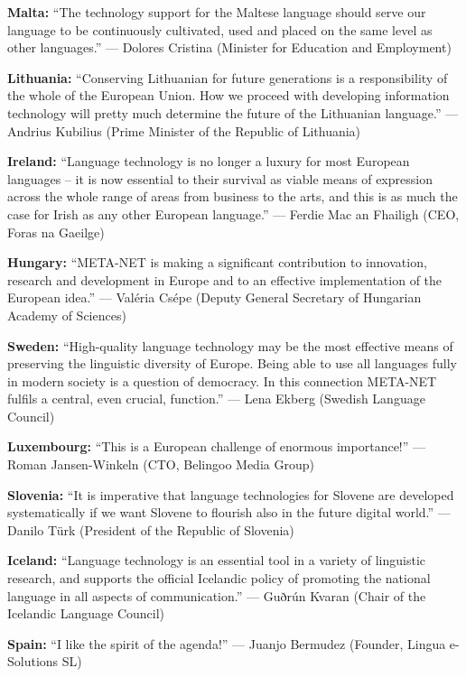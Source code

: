 \documentclass[10pt, plain]{../../metanetpaper}
\begin{document}
\medskip \textbf{Malta:} ``The technology support for the Maltese language should serve our language to be continuously cultivated, used and placed on the same level as other languages.'' --- Dolores Cristina (Minister for Education and Employment)

\medskip \textbf{Lithuania:} ``Conserving Lithuanian for future generations is a responsibility of the whole of the European Union. How we proceed with developing information technology will pretty much determine the future of the Lithuanian language.'' --- Andrius Kubilius (Prime Minister of the Republic of Lithuania)

\medskip \textbf{Ireland:} ``Language technology is no longer a luxury for most European languages -- it is now essential to their survival as viable means of expression across the whole range of areas from business to the arts, and this is as much the case for Irish as any other European language.'' --- Ferdie Mac an Fhailigh (CEO, Foras na Gaeilge)

\medskip \textbf{Hungary:} ``META-NET is making a significant contribution to innovation, research and development in Europe and to an effective implementation of the European idea.'' --- Valéria Csépe (Deputy General Secretary of Hungarian Academy of Sciences)

\medskip \textbf{Sweden:} ``High-quality language technology may be the most effective means of preserving the linguistic diversity of Europe. Being able to use all languages fully in modern society is a question of democracy. In this connection META-NET fulfils a central, even crucial, function.'' --- Lena Ekberg (Swedish Language Council)

\medskip \textbf{Luxembourg:} ``This is a European challenge of enormous importance!'' --- Roman Jansen-Winkeln (CTO, Belingoo Media Group)

\medskip \textbf{Slovenia:} ``It is imperative that language technologies for Slovene are developed systematically if we want Slovene to flourish also in the future digital world.'' --- Danilo Türk (President of the Republic of Slovenia)

\medskip \textbf{Iceland:} ``Language technology is an essential tool in a variety of linguistic research, and supports the official Icelandic policy of promoting the national language in all aspects of communication.'' --- Guðrún Kvaran (Chair of the Icelandic Language Council)

\medskip \textbf{Spain:} ``I like the spirit of the agenda!'' --- Juanjo Bermudez (Founder, Lingua e-Solutions SL)
\end{document}

